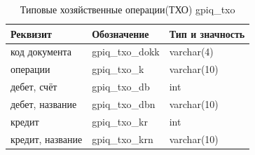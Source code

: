 

\begin{table}[h!p]
    \centering
    \scriptsize
    \caption{Типовые хозяйственные операции(ТХО) gpiq\_txo}
    \begin{tabular}{|l|l|l|} 

                                                                                           \hline
\textbf{Реквизит}                   &\textbf{Обозначение}   &\textbf{Тип и значность}   \\ \hline
код документа                       &gpiq\_txo\_dokk        &varchar(4)                 \\ \hline
операции                            &gpiq\_txo\_k           &varchar(10)                \\ \hline
дебет, счёт                         &gpiq\_txo\_db          &int                        \\ \hline
дебет, название                     &gpiq\_txo\_dbn         &varchar(10)                \\ \hline
кредит                              &gpiq\_txo\_kr          &int                        \\ \hline
кредит, название                    &gpiq\_txo\_krn         &varchar(10)                \\ \hline

    \end{tabular}
\end{table}

